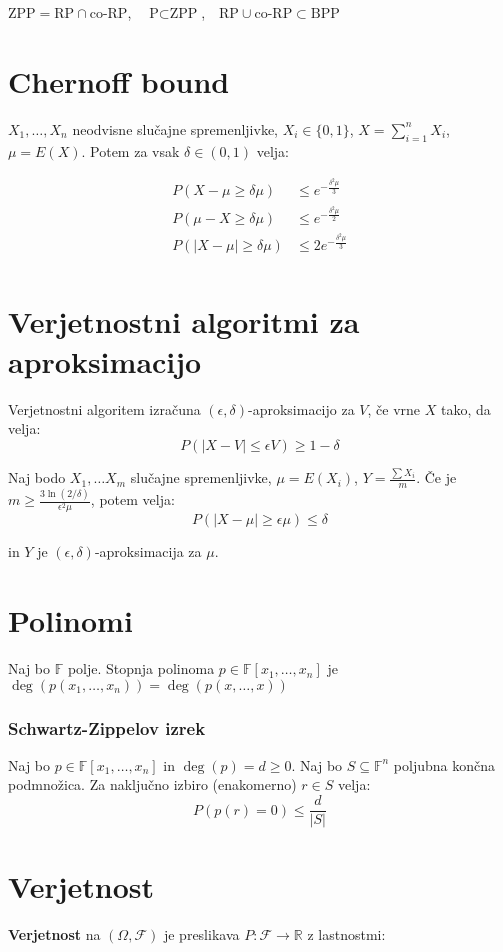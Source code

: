 \begin{multicols}{4}
$\text{ZPP} = \text{RP} \cap \text{co-RP}$,\ \ $\text{P} \subset \text{ZPP}$,\ \ $\text{RP} \cup \text{co-RP} \subset \text{BPP}$

\section{Chernoff bound}
$X_1, \dots, X_n$ neodvisne slučajne spremenljivke, $X_i \in \{0, 1\}$, $X = \sum_{i=1}^n X_i$, $\mu = E(X)$. Potem za vsak $\delta \in (0,1)$ velja:

\begin{align*}
	P(X - \mu \geq \delta \mu) &\leq e^{-\frac{\delta^2 \mu}{3}} \\
	P(\mu - X \geq \delta \mu) &\leq e^{-\frac{\delta^2 \mu}{2}} \\
	P(|X - \mu| \geq \delta \mu) &\leq 2e^{-\frac{\delta^2 \mu}{3}} \\
\end{align*}

\section{Verjetnostni algoritmi za aproksimacijo}
Verjetnostni algoritem izračuna $(\epsilon, \delta)$-aproksimacijo za $V$, če vrne $X$ tako, da velja:
\[ P(|X-V| \leq \epsilon V ) \geq 1 - \delta \]

Naj bodo $X_1, \dots X_m$ slučajne spremenljivke, $\mu = E(X_i)$, $Y = \frac{\sum X_i}{m}$. 
Če je $m \geq \frac{3\ln(2/\delta)}{\epsilon^2 \mu}$, potem velja:
\[ P(|X-\mu| \geq \epsilon \mu) \leq \delta\]

in $Y$ je $(\epsilon, \delta)$-aproksimacija za $\mu$.

\section{Polinomi}
Naj bo $\mathbb{F}$ polje. Stopnja polinoma $p \in \mathbb{F}[x_1, \dots, x_n]$ je $\deg(p(x_1, \dots, x_n)) = \deg(p(x, \dots, x))$

\subsubsection{Schwartz-Zippelov izrek}
Naj bo $p \in \mathbb{F}[x_1, \dots, x_n]$ in $\deg(p) = d \geq 0$. Naj bo $S \subseteq \mathbb{F}^n$ poljubna končna podmnožica. Za naključno izbiro (enakomerno) $r \in S$ velja:
\[ P(p(r) = 0) \leq \frac{d}{|S|} \]

\section{Verjetnost}
\textbf{Verjetnost} na $(\Omega, \mathcal{F})$ je preslikava $P: \mathcal{F} \to \mathbb{R}$ z lastnostmi:


\end{multicols}
